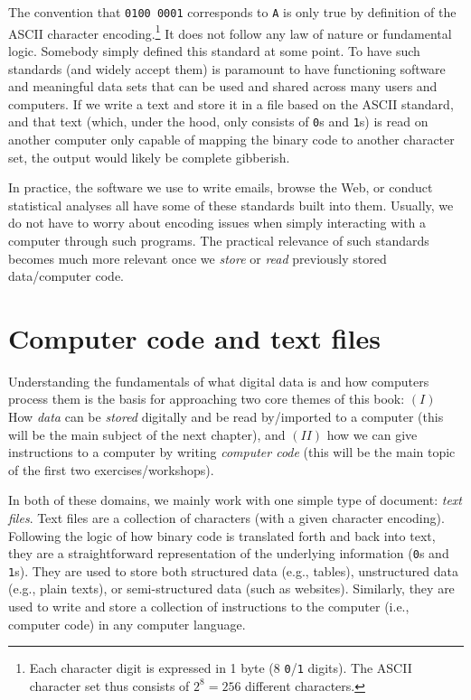 \documentclass[
  12pt,
]{style/krantz}
\begin{document}
The convention that \texttt{0100\ 0001} corresponds to \texttt{A} is only true by definition of the ASCII character encoding.\footnote{Each character digit is expressed in 1 byte (8 \texttt{0}/\texttt{1} digits). The ASCII character set thus consists of \(2^{8}=256\) different characters.} It does not follow any law of nature or fundamental logic. Somebody simply defined this standard at some point. To have such standards (and widely accept them) is paramount to have functioning software and meaningful data sets that can be used and shared across many users and computers. If we write a text and store it in a file based on the ASCII standard, and that text (which, under the hood, only consists of \texttt{0}s and \texttt{1}s) is read on another computer only capable of mapping the binary code to another character set, the output would likely be complete gibberish.

In practice, the software we use to write emails, browse the Web, or conduct statistical analyses all have some of these standards built into them. Usually, we do not have to worry about encoding issues when simply interacting with a computer through such programs. The practical relevance of such standards becomes much more relevant once we \emph{store} or \emph{read} previously stored data/computer code.

\hypertarget{computer-code-and-text-files}{%
\section{Computer code and text files}\label{computer-code-and-text-files}}

Understanding the fundamentals of what digital data is and how computers process them is the basis for approaching two core themes of this book: \((I)\) How \emph{data} can be \emph{stored} digitally and be read by/imported to a computer (this will be the main subject of the next chapter), and \((II)\) how we can give instructions to a computer by writing \emph{computer code} (this will be the main topic of the first two exercises/workshops).

In both of these domains, we mainly work with one simple type of document: \emph{text files}. Text files are a collection of characters (with a given character encoding). Following the logic of how binary code is translated forth and back into text, they are a straightforward representation of the underlying information (\texttt{0}s and \texttt{1}s). They are used to store both structured data (e.g., tables), unstructured data (e.g., plain texts), or semi-structured data (such as websites). Similarly, they are used to write and store a collection of instructions to the computer (i.e., computer code) in any computer language.
\end{document}
